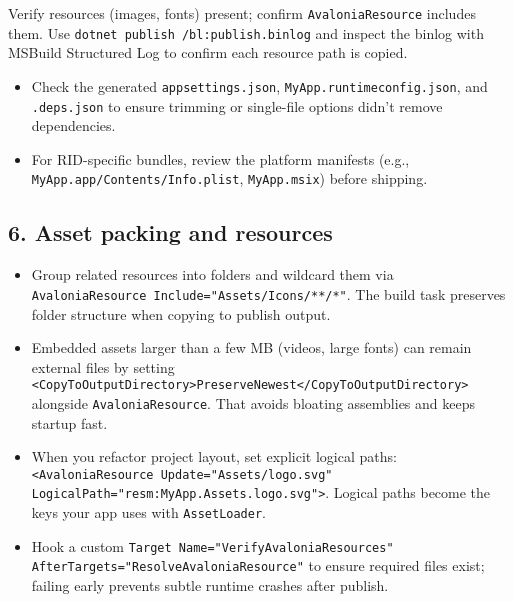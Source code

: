 Verify resources (images, fonts) present; confirm
\passthrough{\lstinline!AvaloniaResource!} includes them. Use
\passthrough{\lstinline!dotnet publish /bl:publish.binlog!} and inspect
the binlog with MSBuild Structured Log to confirm each resource path is
copied.

\begin{itemize}
\tightlist
\item
  Check the generated \passthrough{\lstinline!appsettings.json!},
  \passthrough{\lstinline!MyApp.runtimeconfig.json!}, and
  \passthrough{\lstinline!.deps.json!} to ensure trimming or single-file
  options didn't remove dependencies.
\item
  For RID-specific bundles, review the platform manifests (e.g.,
  \passthrough{\lstinline!MyApp.app/Contents/Info.plist!},
  \passthrough{\lstinline!MyApp.msix!}) before shipping.
\end{itemize}

\subsection{6. Asset packing and
resources}\label{asset-packing-and-resources}

\begin{itemize}
\tightlist
\item
  Group related resources into folders and wildcard them via
  \passthrough{\lstinline!AvaloniaResource Include="Assets/Icons/**/*"!}.
  The build task preserves folder structure when copying to publish
  output.
\item
  Embedded assets larger than a few MB (videos, large fonts) can remain
  external files by setting
  \passthrough{\lstinline!<CopyToOutputDirectory>PreserveNewest</CopyToOutputDirectory>!}
  alongside \passthrough{\lstinline!AvaloniaResource!}. That avoids
  bloating assemblies and keeps startup fast.
\item
  When you refactor project layout, set explicit logical paths:
  \passthrough{\lstinline!<AvaloniaResource Update="Assets/logo.svg" LogicalPath="resm:MyApp.Assets.logo.svg">!}.
  Logical paths become the keys your app uses with
  \passthrough{\lstinline!AssetLoader!}.
\item
  Hook a custom
  \passthrough{\lstinline!Target Name="VerifyAvaloniaResources" AfterTargets="ResolveAvaloniaResource"!}
  to ensure required files exist; failing early prevents subtle runtime
  crashes after publish.
\end{itemize}

